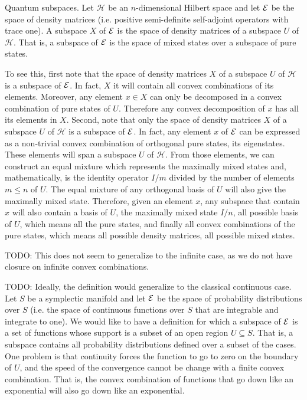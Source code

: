 \begin{example} Quantum subspaces.
	Let $\mathcal{H}$ be an $n$-dimensional Hilbert space and let $\mathcal{E}$ be the space of density matrices (i.e. positive semi-definite self-adjoint operators with trace one). A subspace $X$ of $\mathcal{E}$ is the space of density matrices of a subspace $U$ of $\mathcal{H}$. That is, a subspace of $\mathcal{E}$ is the space of mixed states over a subspace of pure states.
	
	To see this, first note that the space of density matrices $X$ of a subspace $U$ of $\mathcal{H}$ is a subspace of $\mathcal{E}$. In fact, $X$ it will contain all convex combinations of its elements. Moreover, any element $x \in X$ can only be decomposed in a convex combination of pure states of $U$. Therefore any convex decomposition of $x$ has all its elements in $X$. Second, note that only the space of density matrices $X$ of a subspace $U$ of $\mathcal{H}$ is a subspace of $\mathcal{E}$. In fact, any element $x$ of $\mathcal{E}$ can be expressed as a non-trivial convex combination of orthogonal pure states, its eigenstates. These elements will span a subspace $U$ of $\mathcal{H}$. From those elements, we can construct an equal mixture which represents the maximally mixed states and, mathematically, is the identity operator $I/m$ divided by the number of elements $m \leq n$ of $U$. The equal mixture of any orthogonal basis of $U$ will also give the maximally mixed state. Therefore, given an element $x$, any subspace that contain $x$ will also contain a basis of $U$, the maximally mixed state $I/n$, all possible basis of $U$, which means all the pure states, and finally all convex combinations of the pure states, which means all possible density matrices, all possible mixed states.
	
	TODO: This does not seem to generalize to the infinite case, as we do not have closure on infinite convex combinations.
\end{example}

\begin{remark}
	TODO: Ideally, the definition would generalize to the classical continuous case. Let $S$ be a symplectic manifold and let $\mathcal{E}$ be the space of probability distributions over $S$ (i.e. the space of continuous functions over $S$ that are integrable and integrate to one). We would like to have a definition for which a subspace of $\mathcal{E}$ is a set of functions whose support is a subset of an open region $U \subseteq S$. That is, a subspace contains all probability distributions defined over a subset of the cases. One problem is that continuity forces the function to go to zero on the boundary of $U$, and the speed of the convergence cannot be change with a finite convex combination. That is, the convex combination of functions that go down like an exponential will also go down like an exponential.
\end{remark}

